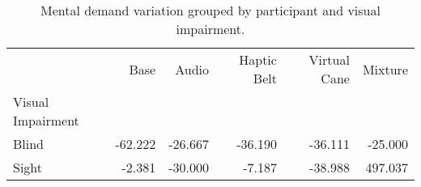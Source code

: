 
\begin{table}[!htb]
\centering
\caption{Mental demand variation grouped by participant and visual impairment.}
\label{tab:md_var_average_group}
\begin{tabular}{lrrrrr}
\toprule
{} &    Base &   Audio &  Haptic Belt &  Virtual Cane &  Mixture \\
Visual Impairment &         &         &              &               &          \\
\midrule
Blind             & -62.222 & -26.667 &      -36.190 &       -36.111 &  -25.000 \\
Sight             &  -2.381 & -30.000 &       -7.187 &       -38.988 &  497.037 \\
\bottomrule
\end{tabular}
\end{table}

